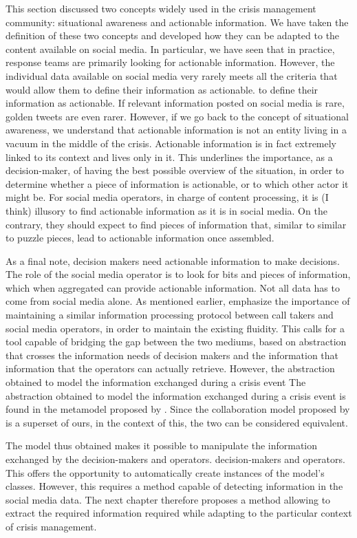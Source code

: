This section discussed two concepts widely used in the crisis management community: situational awareness and actionable information.
We have taken the definition of these two concepts and developed how they can be adapted to the content available on social media.
In particular, we have seen that in practice, response teams are primarily looking for actionable information.
However, the individual data available on social media very rarely meets all the criteria that would allow them to define their information as actionable.
to define their information as actionable.
If relevant information posted on social media is rare, golden tweets are even rarer.
However, if we go back to the concept of situational awareness, we understand that actionable information is not an entity living in a vacuum in the middle of the crisis.
Actionable information is in fact extremely linked to its context and lives only in it.
This underlines the importance, as a decision-maker, of having the best possible overview of the situation, in order to determine
whether a piece of information is actionable, or to which other actor it might be.
For social media operators, in charge of content processing, it is (I think) illusory to find actionable information as it is in social media.
On the contrary, they should expect to find pieces of information that, similar to
similar to puzzle pieces, lead to actionable information once assembled.

As a final note, decision makers need actionable information to make decisions.
The role of the social media operator is to look for bits and pieces of information, which when aggregated can provide actionable information.
Not all data has to come from social media alone.
As mentioned earlier, \textcite{graceRolePlayingNext2019} emphasize the importance of
maintaining a similar information processing protocol between call takers and social media
operators, in order to maintain the existing fluidity.
This calls for a tool capable of bridging the gap between the two mediums, based on
abstraction that crosses the information needs of decision makers and the information that
information that the operators can actually retrieve.
However, the abstraction obtained to model the information exchanged during a crisis event
The abstraction obtained to model the information exchanged during a crisis event is found in the metamodel proposed by \textcite{benabenMetamodelKnowledgeManagement2016}.
Since the collaboration model proposed by \citeauthor{benabenMetamodelKnowledgeManagement2016} is
a superset of ours, in the context of this, the two can be considered equivalent.

The model thus obtained makes it possible to manipulate the information exchanged by the decision-makers and operators.
decision-makers and operators.
This offers the opportunity to automatically create instances of the model's classes.
However, this requires a method
capable of detecting information in the social media data.
The next chapter therefore proposes a method allowing to extract the required information required while adapting to the particular context of crisis management.

